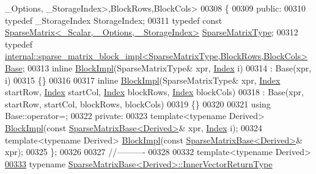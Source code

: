 \begin{DoxyCode}
       \_Options, \_StorageIndex>,BlockRows,BlockCols>
00308 \{
00309 \textcolor{keyword}{public}:
00310   \textcolor{keyword}{typedef} \_StorageIndex StorageIndex;
00311   \textcolor{keyword}{typedef} \textcolor{keyword}{const} \hyperlink{group___sparse_core___module_class_eigen_1_1_sparse_matrix}{SparseMatrix<\_Scalar, \_Options, \_StorageIndex>}
       \hyperlink{group___sparse_core___module_class_eigen_1_1_sparse_matrix}{SparseMatrixType};
00312   \textcolor{keyword}{typedef} 
      \hyperlink{class_eigen_1_1internal_1_1sparse__matrix__block__impl}{internal::sparse\_matrix\_block\_impl<SparseMatrixType,BlockRows,BlockCols>}
       \hyperlink{class_eigen_1_1internal_1_1sparse__matrix__block__impl}{Base};
00313   \textcolor{keyword}{inline} \hyperlink{class_eigen_1_1_block_impl}{BlockImpl}(SparseMatrixType& xpr, \hyperlink{group___core___module_a554f30542cc2316add4b1ea0a492ff02}{Index} i)
00314     : Base(xpr, i)
00315   \{\}
00316 
00317   \textcolor{keyword}{inline} \hyperlink{class_eigen_1_1_block_impl}{BlockImpl}(SparseMatrixType& xpr, \hyperlink{group___core___module_a554f30542cc2316add4b1ea0a492ff02}{Index} startRow, \hyperlink{group___core___module_a554f30542cc2316add4b1ea0a492ff02}{Index} startCol, 
      \hyperlink{group___core___module_a554f30542cc2316add4b1ea0a492ff02}{Index} blockRows, \hyperlink{group___core___module_a554f30542cc2316add4b1ea0a492ff02}{Index} blockCols)
00318     : Base(xpr, startRow, startCol, blockRows, blockCols)
00319   \{\}
00320 
00321   \textcolor{keyword}{using} Base::operator=;
00322 \textcolor{keyword}{private}:
00323   \textcolor{keyword}{template}<\textcolor{keyword}{typename} Derived> \hyperlink{class_eigen_1_1_block_impl}{BlockImpl}(\textcolor{keyword}{const} \hyperlink{group___sparse_core___module_class_eigen_1_1_sparse_matrix_base}{SparseMatrixBase<Derived>}& 
      xpr, \hyperlink{group___core___module_a554f30542cc2316add4b1ea0a492ff02}{Index} i);
00324   \textcolor{keyword}{template}<\textcolor{keyword}{typename} Derived> \hyperlink{class_eigen_1_1_block_impl}{BlockImpl}(\textcolor{keyword}{const} \hyperlink{group___sparse_core___module_class_eigen_1_1_sparse_matrix_base}{SparseMatrixBase<Derived>}& 
      xpr);
00325 \};
00326 
00327 \textcolor{comment}{//----------}
00328 
00332 \textcolor{keyword}{template}<\textcolor{keyword}{typename} Derived>
\hyperlink{group___sparse_core___module_a65aaf3b50d205011e2bfa0de24756cce}{00333} \textcolor{keyword}{typename} \hyperlink{group___core___module_class_eigen_1_1_block}{SparseMatrixBase<Derived>::InnerVectorReturnType} 

\end{DoxyCode}
